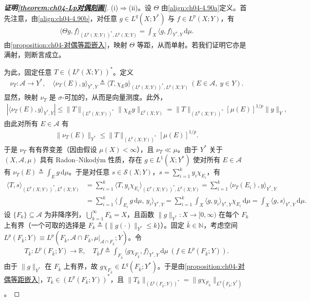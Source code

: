 \documentclass[../../main.tex]{subfiles}%
\begin{document}
\begin{proof}[\textbf{证明\cref{theorem:ch04-Lp对偶刻画}}]
(i)$\Rightarrow$(ii)。设 $\Theta$ 由\eqref{align:ch04-4.90a}定义。首先注意，由\eqref{align:ch04-4.90b}，对任意 $g\in L^q(X;Y^*)$ 与 $f\in L^p(X;Y)$，有
\begin{align}
\langle\Theta g,f\rangle_{(L^p(X;Y))^*,L^p(X;Y)}=\int_X\langle g,f\rangle_{Y^*,Y}\,\mathrm{d}\mu. \label{align:ch04-4.97}
\end{align}
由\cref{proposition:ch04-对偶等距嵌入}，映射 $\Theta$ 等距，从而单射。若我们证明它亦是满射，则断言成立。

为此，固定任意 $T\in(L^p(X;Y))^*$。定义
\begin{align*}
\nu_T:\mathcal{A}\to Y^*,\quad \langle\nu_T(E),y\rangle_{Y^*,Y}\triangleq \langle T,\chi_Ey\rangle_{(L^p(X;Y))^*,L^p(X;Y)}\ (E\in\mathcal{A},\ y\in Y).
\end{align*}
显然，映射 $\nu_T$ 是 $\sigma$-可加的，从而是向量测度。此外，
\begin{align*}
|\langle\nu_T(E),y\rangle_{Y^*,Y}|\leqslant\|T\|_{(L^p(X;Y))^*}\|\chi_Ey\|_{L^p(X;Y)}=\|T\|_{(L^p(X;Y))^*}[\mu(E)]^{1/p}\|y\|_Y,
\end{align*}
由此对所有 $E\in\mathcal{A}$ 有
\begin{align*}
\|\nu_T(E)\|_{Y^*}\leqslant\|T\|_{(L^p(X;Y))^*}[\mu(E)]^{1/p}.
\end{align*}
于是 $\nu_T$ 有有界变差（因由假设 $\mu(X)<\infty$），且 $\nu_T\ll\mu$。由于 $Y^*$ 关于 $(X,\mathcal{A},\mu)$ 具有 Radon--Nikodým 性质，存在 $g\in L^1(X;Y^*)$ 使对所有 $E\in\mathcal{A}$ 有 $\nu_T(E)\triangleq \int_E g\,\mathrm{d}\mu$。于是对任意 $s\in\mathcal{S}(X;Y)$，$s=\sum_{i=1}^k y_i\chi_{E_i}$，有
\begin{align}
\langle T,s\rangle_{(L^p(X;Y))^*,L^p(X;Y)}
&=\sum_{i=1}^k\langle T,y_i\chi_{E_i}\rangle_{(L^p(X;Y))^*,L^p(X;Y)}
=\sum_{i=1}^k\langle\nu_T(E_i),y\rangle_{Y^*,Y}\nonumber\\
&=\sum_{i=1}^k\Big\langle\int_{E_i}g\,\mathrm{d}\mu,\,y_i\Big\rangle_{Y^*,Y}
=\sum_{i=1}^k\int_X\langle g,y_i\rangle_{Y^*,Y}\chi_{E_i}\,\mathrm{d}\mu
=\int_X\langle g,s\rangle_{Y^*,Y}\,\mathrm{d}\mu. \label{align:ch04-4.98}
\end{align}
设 $\{F_k\}\subseteq\mathcal{A}$ 为非降序列，$\bigcup_{k=1}^\infty F_k=X$，且函数 $\|g\|_{Y^*}:X\to[0,\infty)$ 在每个 $F_k$ 上有界（一个可取的选择是 $F_k\triangleq \{\|g(\cdot)\|_{Y^*}\leqslant k\}$）。固定 $\bar k\in\mathbb{N}$，考虑空间 $L^p(F_{\bar k};Y)\equiv L^p(F_{\bar k},\mathcal{A}\cap F_{\bar k},\mu|_{\mathcal{A}\cap F_{\bar k}};Y)$。令
\begin{align}
T_{\bar k}:L^p(F_{\bar k};Y)\to\mathbb{R},\quad T_{\bar k}f\triangleq \int_{F_{\bar k}}\langle g\chi_{F_{\bar k}},f\rangle_{Y^*,Y}\,\mathrm{d}\mu\ (f\in L^p(F_{\bar k};Y)). \label{align:ch04-4.99}
\end{align}
由于 $\|g\|_{Y^*}$ 在 $F_{\bar k}$ 上有界，故 $g\chi_{F_{\bar k}}\in L^q(F_{\bar k};Y^*)$。于是由\cref{proposition:ch04-对偶等距嵌入}，$T_{\bar k}\in(L^p(F_{\bar k};Y))^*$，且 $\|T_{\bar k}\|_{(L^p(F_{\bar k};Y))^*}=\|g\chi_{F_{\bar k}}\|_{L^q(F_{\bar k};Y^*)}$。


\end{proof}
\end{document}
